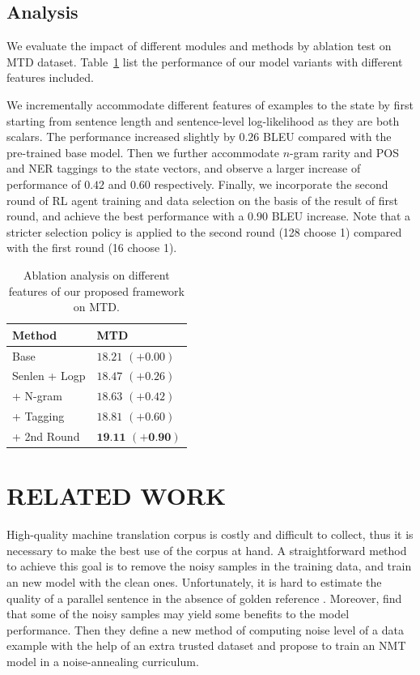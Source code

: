 \documentclass[letterpaper]{article}
\begin{document}
\subsection{Analysis}
We evaluate the impact of different modules and methods by ablation test on MTD dataset. Table~\ref{tab:ablation} list the performance of our model variants with different features included.

We incrementally accommodate different features of examples to the state by first starting from sentence length and sentence-level log-likelihood as they are both scalars. The performance increased slightly by $0.26$ BLEU compared with the pre-trained base model. Then we further accommodate $n$-gram rarity and POS and NER taggings to the state vectors, and observe a larger increase of performance of $0.42$ and $0.60$ respectively. Finally, we incorporate the second round of RL agent training and data selection on the basis of the result of first round, and achieve the best performance with a $0.90$ BLEU increase. Note that a stricter selection policy is applied to the second round (128 choose 1) compared with the first round (16 choose 1). 
	
\begin{table}[tb]
	\centering
    \begin{threeparttable}
      \caption{Ablation analysis on different features of our proposed framework on MTD.}
      \label{tab:ablation}
      \begin{tabular}{l|l}
        \toprule
        Method & MTD\\
        \midrule
        Base & $18.21$ $(+0.00)$\\
        Senlen + Logp &  $18.47$ $(+0.26)$\\
        + N-gram &  $18.63$ $(+0.42)$\\
        + Tagging &  $18.81$ $(+0.60)$\\
        + 2nd Round &  $\textbf{19.11}$  $(+\textbf{0.90})$\\
        \bottomrule
      \end{tabular}
    \end{threeparttable}
\end{table}

\section{RELATED WORK}
\label{sec:related}

High-quality machine translation corpus is costly and difficult to collect, thus it is necessary to make the best use of the corpus at hand. A straightforward method to achieve this goal is to remove the noisy samples in the training data, and train an new model with the clean ones. Unfortunately, it is hard to estimate the quality of a parallel sentence in the absence of golden reference \cite{fan2019bilingual}.  Moreover, \cite{wang2018denoising} find that some of the noisy samples may yield some benefits to the model performance. Then they define a new method of computing noise level of a data example with the help of an extra trusted dataset and propose to train an NMT model in a noise-annealing curriculum.
\end{document}
